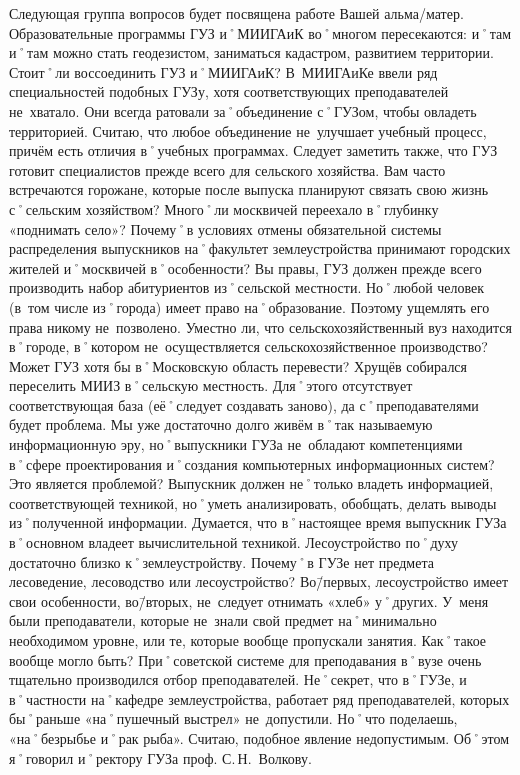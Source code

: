 \begin{drama}
	\maxspeaks Следующая группа вопросов будет посвящена работе Вашей альма\-/матер. Образовательные программы ГУЗ и˚МИИГАиК во˚многом пересекаются: и˚там и˚там можно стать геодезистом, заниматься кадастром, развитием территории. Стоит˚ли воссоединить ГУЗ и˚МИИГАиК? 
	\michaelspeaks В~МИИГАиКе ввели ряд специальностей подобных ГУЗу, хотя соответствующих преподавателей не~хватало. Они всегда ратовали за˚объединение с˚ГУЗом, чтобы овладеть территорией. Считаю, что любое объединение не~улучшает учебный процесс, причём есть отличия в˚учебных программах. Следует заметить также, что ГУЗ готовит специалистов прежде всего для сельского хозяйства.		
	\maxspeaks Вам часто встречаются горожане, которые после выпуска планируют связать свою жизнь с˚сельским хозяйством? Много˚ли москвичей переехало в˚глубинку  «поднимать село»? Почему˚в условиях отмены обязательной системы распределения выпускников на˚факультет землеустройства принимают городских жителей и˚москвичей в˚особенности? 
	\michaelspeaks Вы правы, ГУЗ должен прежде всего производить набор абитуриентов из˚сельской местности. Но˚любой человек (в~том числе из˚города) имеет право на˚образование. Поэтому ущемлять его права никому не~позволено. 
	\maxspeaks Уместно ли, что сельскохозяйственный вуз находится в˚городе, в˚котором не~осуществляется сельскохозяйственное производство? Может ГУЗ хотя бы в˚Московскую область перевести?
	\michaelspeaks Хрущёв собирался переселить МИИЗ в˚сельскую местность. Для˚этого отсутствует соответствующая база (её˚следует создавать заново), да с˚преподавателями будет проблема.
	\maxspeaks Мы уже достаточно долго живём в˚так называемую информационную эру, но˚выпускники ГУЗа не~обладают компетенциями в˚сфере проектирования и˚создания компьютерных информационных систем? Это является проблемой?
	\michaelspeaks Выпускник должен не˚только владеть информацией, соответствующей техникой, но˚уметь анализировать, обобщать, делать выводы из˚полученной информации. Думается, что в˚настоящее время выпускник ГУЗа в˚основном владеет вычислительной техникой.
	\maxspeaks Лесоустройство по˚духу достаточно близко к˚землеустройству. Почему˚в ГУЗе нет предмета лесоведение, лесоводство или лесоустройство?
	\michaelspeaks Во\=/первых, лесоустройство имеет свои особенности, во\=/вторых, не~следует отнимать «хлеб» у˚других.
	\maxspeaks У~меня были преподаватели, которые не~знали свой предмет на˚минимально необходимом уровне, или те, которые вообще пропускали занятия. Как˚такое вообще могло быть? 
	\michaelspeaks При˚советской системе для преподавания в˚вузе очень тщательно производился отбор преподавателей. Не˚секрет, что в˚ГУЗе, и в˚частности на˚кафедре землеустройства, работает ряд преподавателей, которых бы˚раньше «на˚пушечный выстрел» не~допустили. Но˚что поделаешь, «на˚безрыбье и˚рак рыба». Считаю, подобное явление недопустимым. Об˚этом я˚говорил и˚ректору ГУЗа проф. С.\,Н.~Волкову.

\end{drama}

